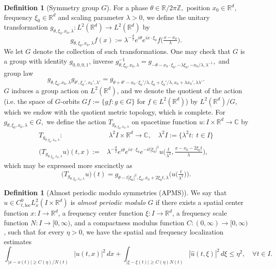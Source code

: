 \documentclass[reqno,11pt]{amsart}
\theoremstyle{plain}
\theoremstyle{definition}
\newtheorem{definition}[theorem]{Definition}
\numberwithin{equation}{section}
\numberwithin{theorem}{section}
\def\geq{\geqslant}
\def\leq{\leqslant}
\def\R{\mathbb{R}}
\def\C{\mathbb{C}}
\begin{document}
\begin{definition}[Symmetry group $G$]
For a phase $\theta\in\R/2\pi\mathbb{Z},$ position $x_0\in\R^d,$ frequency $\xi_0\in\R^d$ and scaling parameter $\lambda>0$, we define the unitary transformation $g_{\theta,\xi_0,x_0,\lambda}: L^2(\R^d)\to L^2(\R^d)$ by
\begin{equation}\label{equ:gtrandef}
g_{\theta,\xi_0,x_0,\lambda}f(x):=\lambda^{-\frac{d}{2}}e^{i\theta}e^{ix\cdot\xi_0}f\big(\tfrac{x-x_0}{\lambda}\big).
\end{equation}
We let $G$ denote the collection of such transformations. One may check that $G$ is a group with identity $g_{0,0,0,1}$, inverse $g_{\theta,\xi_0,x_0,\lambda}^{-1}=g_{-\theta-x_0\cdot\xi_0,-\lambda\xi_0,-x_0/\lambda,\lambda^{-1}},$ and group law
\begin{equation}\label{equ:gtrslaw}
g_{\theta,\xi_0,x_0,\lambda}g_{\theta',\xi_0',x_0',\lambda'}
=g_{\theta+\theta'-x_0\cdot\xi_0'/\lambda,\xi_0+\xi_0'/\lambda,x_0+\lambda x_0',\lambda\lambda'}.
\end{equation}
$G$ induces a group action on $L^2(\R^d)$, and we denote the quotient of the action (i.e. the space of $G$-orbits $Gf:=\{gf: g\in G\}$ for $f\in L^2(\R^d)$) by $L^2(\R^d)/G$, which we endow with the quotient metric topology, which is complete. For $g_{\theta,\xi_0,x_0,\lambda}\in G,$ we define the action $T_{g_{\theta,\xi_0,x_0,\lambda}}$ on spacetime function $u:I\times\R^d\to\C$ by 
\begin{align}\label{equ:Tgthedef}
T_{g_{\theta,\xi_0,x_0,\lambda}}:&\;\lambda^2I\times\R^d\to\C,\quad \lambda^2I:=\{\lambda^2t:\;t\in I\}\\\label{equ:Tgtxdef}
\big(T_{g_{\theta,\xi_0,x_0,\lambda}}u\big)(t,x):=&\lambda^{-\frac{d}{2}}
e^{i\theta}e^{ix\cdot\xi_0}e^{-it|\xi_0|^2}u\big(\tfrac{t}{\lambda^2},\tfrac{x-x_0-2\xi_0t}{\lambda}\big),
\end{align}
which may be expressed more succinctly as 
\begin{equation}\label{equ:Tganodef}
\big(T_{g_{\theta,\xi_0,x_0,\lambda}}u\big)(t)=g_{\theta-t|\xi_0|^2,\xi_0,x_0+2\xi_0t,\lambda}\Big(u\big(\tfrac{t}{\lambda^2}\big)\Big).
\end{equation}
\end{definition}
\begin{definition}[Almost periodic modulo symmetries (APMS)] \label{def:apms}
We say that $ u \in C_{t,\text{loc}}^0 L_x^2(I \times \mathbb{R}^d) $ is \emph{almost periodic modulo $ G $} if there exists a spatial center function $ x : I \to \mathbb{R}^d $, a frequency center function $ \xi : I \to \mathbb{R}^d $, a frequency scale function $ N : I \to [0, \infty) $, and a compactness modulus function $ C : (0, \infty) \to [0, \infty) $, such that for every $ \eta > 0 $, we have the spatial and frequency localization estimates
\[
\int_{|x-x(t)| \geq C(\eta)/N(t)} |u(t,x)|^2 \, dx + \int_{|\xi-\xi(t)| \geq C(\eta)N(t)} |\hat{u}(t,\xi)|^2 \, d\xi \leq \eta^2, \quad \forall t \in I. 
\]
\end{definition}
\end{document}
